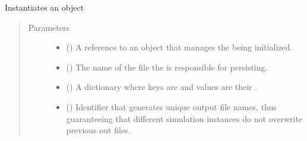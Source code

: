 \documentclass[letterpaper,10pt,english]{sphinxmanual}
\begin{document}
\begin{fulllineitems}

\begin{fulllineitems}
\label{\detokenize{app.domain:app.domain.cluster_groups.SGCluster.__init__}}
Instantiates an  object
\begin{quote}\begin{description}
\item[{Parameters}] \leavevmode\begin{itemize}
\item {} 
 ({\hyperref[\detokenize{app:app.type_hints.MasterType}]{}}) \textendash{} A reference to an {\hyperref[\detokenize{app.domain:app.domain.master_servers.Master}]{}}
object that manages the  being initialized.

\item {} 
 () \textendash{} The name of the file the  is responsible for
persisting.

\item {} 
 ({\hyperref[\detokenize{app:app.type_hints.NodeDict}]{}}) \textendash{} A dictionary where keys are {\hyperref[\detokenize{app.domain:app.domain.network_nodes.Node.id}]{}} and values are their
{\hyperref[\detokenize{app.domain:app.domain.network_nodes.Node}]{}}.

\item {} 
 () \textendash{} Identifier that generates unique output file names,
thus guaranteeing that different simulation instances do not
overwrite previous out files.


\end{itemize}
\end{description}
\end{quote}
\end{fulllineitems}
\end{fulllineitems}
\end{document}
